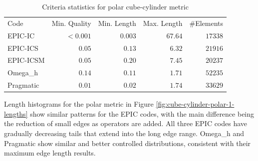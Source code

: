 \documentclass[3p,times,procedia,number]{elsarticle}
\begin{document}
\begin{table}
\caption{Criteria statistics for polar cube-cylinder metric}
\label{tab:polar-1-stats}
\begin{tabular}{lrrrr}
Code & Min. Quality & Min. Length & Max. Length & \#Elements\\
EPIC-IC    &$<0.001$&      $0.003$&      $67.64$&    $17338$\\
EPIC-ICS   &$  0.05$&      $ 0.13$&      $ 6.32$&    $21916$\\
EPIC-ICSM  &$  0.05$&      $ 0.20$&      $ 7.45$&    $20237$\\
Omega\_h   &$  0.14$&      $ 0.11$&      $ 1.71$&    $52235$\\
Pragmatic  &$  0.01$&      $ 0.02$&      $ 1.74$&    $33629$\\
\end{tabular}
\end{table}

Length histograms for the polar metric in Figure \ref{fig:cube-cylinder-polar-1-lengths}
show similar patterns for the EPIC codes, with the main difference being the
reduction of small edges as operators are added.
All three EPIC codes have gradually decreasing tails that extend into the long edge range.
Omega\_h and Pragmatic show similar and better controlled distributions, consistent
with their maximum edge length results.
\end{document}
